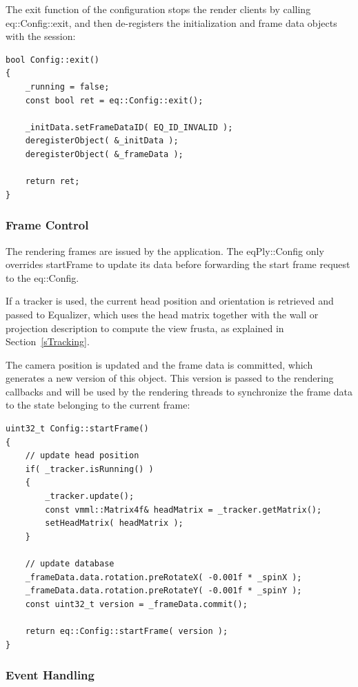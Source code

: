 \documentclass[10pt,a4]{scrartcl}
\newcommand{\sref}[1]{Section~\ref{#1}}
\begin{document}
The exit function of the configuration stops the render clients by calling
\textsf{eq::Con\-fig::exit}, and then de-registers the initialization and
frame data objects with the session:

{\footnotesize\begin{lstlisting}
bool Config::exit()
{
    _running = false;
    const bool ret = eq::Config::exit();

    _initData.setFrameDataID( EQ_ID_INVALID );
    deregisterObject( &_initData );
    deregisterObject( &_frameData );

    return ret;
}
\end{lstlisting}}

\subsubsection{Frame Control}

The rendering frames are issued by the application. The
\textsf{eqPly::Config} only overrides \textsf{startFrame} to
update its data before forwarding the start frame request to the
\textsf{eq::Config}.

If a tracker is used, the current head position and orientation is
retrieved and passed to Equalizer, which uses the head matrix together
with the wall or projection description to compute the view
frusta, as explained in \sref{sTracking}.

The camera position is updated and the frame data is committed, which
generates a new version of this object. This version is passed to the
rendering callbacks and will be used by the rendering threads to
synchronize the frame data to the state belonging to the current frame:

{\footnotesize\begin{lstlisting}
uint32_t Config::startFrame()
{
    // update head position
    if( _tracker.isRunning() )
    {
        _tracker.update();
        const vmml::Matrix4f& headMatrix = _tracker.getMatrix();
        setHeadMatrix( headMatrix );
    }

    // update database
    _frameData.data.rotation.preRotateX( -0.001f * _spinX );
    _frameData.data.rotation.preRotateY( -0.001f * _spinY );
    const uint32_t version = _frameData.commit();

    return eq::Config::startFrame( version );
}
\end{lstlisting}}


\subsubsection{Event Handling}
\end{document}

